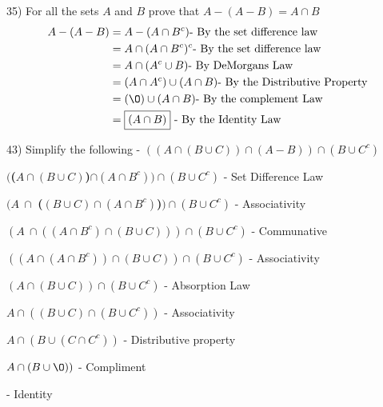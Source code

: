 \documentclass[11pt]{article}
\newcommand*{\mybox}[1]{\framebox{#1}}
\begin{document}
\begin{flushleft}
\hrulefill

35) For all the sets $A$ and $B$ prove that $A-(A-B) = A\cap B$
\vspace{-3mm}
\begin{align*}
A-(A-B) &= A - (A\cap B^c) \text{- By the set difference law}\\
		&= A \cap (A\cap B^c)^c \text{- By the set difference law}\\ 
		&= A \cap (A^c \cup B) \text{- By DeMorgans Law}\\ 
		&= (A \cap A^c) \cup (A\cap B) \text{- By the Distributive Property}\\ 
		&= (\O) \cup (A\cap B) \text{- By the complement Law}\\ 
		&= \text{\mybox{$(A\cap B)$} - By the Identity Law}\\ 
\end{align*}
\vspace{-14mm}

\hrulefill

43) Simplify the following - $((A \cap (B \cup C)) \cap (A-B))\cap (B\cup C^c) $
\begin{center}
$ ($\textbf{(}$A \cap (B \cup C)$\textbf{)}$ \cap (A\cap B^c))\cap (B\cup C^c)$ - Set Difference Law

$ (A\  \cap $ \textbf{(}$(B \cup C) \cap (A\cap B^c)$\textbf{)}$)\cap (B\cup C^c)$ - Associativity

$ (A\  \cap ( (A\cap B^c)\cap (B \cup C)))\cap (B\cup C^c)$ - Communative

$ ((A \cap (A\cap B^c)) \cap (B \cup C))\cap (B\cup C^c)$ - Associativity

$ (A \cap (B \cup C))\cap (B\cup C^c)$ - Absorption Law

$ A \cap ((B \cup C)\cap (B\cup C^c))$ - Associativity

$ A \cap (B \cup (C\cap C^c)) $ - Distributive property

$A \cap (B \cup \O))$ - Compliment

\mybox{$ A \cap B$} - Identity 
\end{center}
\end{flushleft}
\end{document}
